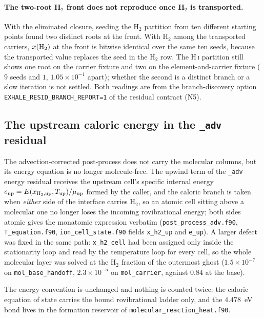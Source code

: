 \documentclass[english,a4paper]{my_memo}
\begin{document}
\paragraph{The two-root H$_2$ front does not reproduce once H$_2$ is
transported.} With the eliminated closure, seeding the H$_2$ partition from
ten different starting points found two distinct roots at the front.
With H$_2$ among the transported carriers, $x({\rm H_2})$ at the front is
bitwise identical over the same ten seeds, because the transported value
replaces the seed in the H$_2$ row. The H\,\textsc{i} partition still shows
one root on the carrier fixture and two on the element-and-carrier fixture
($9$ seeds and $1$, $1.05\times10^{-1}$ apart); whether the second is a
distinct branch or a slow iteration is not settled. Both readings are from the
branch-discovery option \texttt{EXHALE\_RESID\_BRANCH\_REPORT=1} of the residual
contract (N5).

\subsection{The upstream caloric energy in the \texttt{\_adv} residual}
\label{sec:advcaloric}

The advection-corrected post-process does not carry the molecular columns,
but its energy equation is no longer molecule-free. The upwind term of the
\texttt{\_adv} energy residual receives the upstream cell's specific internal
energy $e_{\rm up} = E(x_{{\rm H_2},{\rm up}}, T_{\rm up})/\mu_{\rm up}$
formed by the caller, and the caloric branch is taken when \emph{either} side
of the interface carries H$_2$, so an atomic cell sitting above a molecular
one no longer loses the incoming rovibrational energy; both sides atomic
gives the monatomic expression verbatim
(\texttt{post\_process\_adv.f90}, \texttt{T\_equation.f90},
\texttt{ion\_cell\_state.f90} fields \texttt{x\_h2\_up} and \texttt{e\_up}).
A larger defect was fixed in the same path: \texttt{x\_h2\_cell} had been
assigned only inside the stationarity loop and read by the temperature loop
for every cell, so the whole molecular layer was solved at the H$_2$ fraction
of the outermost ghost ($1.5\times10^{-7}$ on \texttt{mol\_base\_handoff},
$2.3\times10^{-5}$ on \texttt{mol\_carrier}, against $0.84$ at the base).

The energy convention is unchanged and nothing is counted twice: the caloric
equation of state carries the bound rovibrational ladder only, and the
$4.478$~eV bond lives in the formation reservoir of
\texttt{molecular\_reaction\_heat.f90}.
\end{document}

